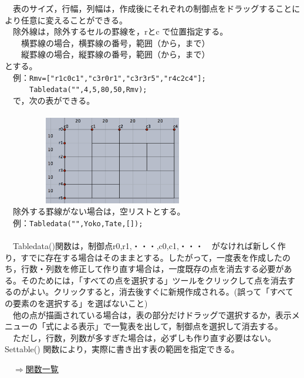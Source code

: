 \documentclass[papersize,a4paper,12pt,uplatex]{jsarticle}
\begin{document}
\begin{description}
　表のサイズ，行幅，列幅は，作成後にそれぞれの制御点をドラッグすることにより任意に変えることができる。\\

　除外線は，除外するセルの罫線を，rとc で位置指定する。\\
　　横罫線の場合，横罫線の番号，範囲（から，まで）\\
　　縦罫線の場合，縦罫線の番号，範囲（から，まで）\\
とする。\\

　例：\verb|Rmv=["r1c0c1","c3r0r1","c3r3r5","r4c2c4"];|\\
　　　\verb|Tabledata("",4,5,80,50,Rmv);|\\
　で，次の表ができる。\\
　\\
　　　　　\includegraphics[bb=0 0 784 503 , width=6cm]{Fig/table03.png}\\
　除外する罫線がない場合は，空リストとする。\\

　例：\verb|Tabledata("",Yoko,Tate,[]);|\\
\\
　Tabledata()関数は，制御点r0,r1,・・・,c0,c1,・・・　がなければ新しく作り，すでに存在する場合はそのままとする。したがって，一度表を作成したのち，行数・列数を修正して作り直す場合は，一度既存の点を消去する必要がある。そのためには，「すべての点を選択する」ツールをクリックして点を消去するのがよい。クリックすると，消去後すぐに新規作成される。(誤って「すべての要素のを選択する」を選ばないこと)\\
　他の点が描画されている場合は，表の部分だけドラッグで選択するか，表示メニューの「式による表示」で一覧表を出して，制御点を選択して消去する。\\
　ただし，行数，列数が多すぎた場合は，必ずしも作り直す必要はない。Settable() 関数により，実際に書き出す表の範囲を指定できる。\\

\begin{flushright}　\hyperlink{functionlist}{$\Rightarrow$関数一覧}\end{flushright}


\end{description}
\end{document}
